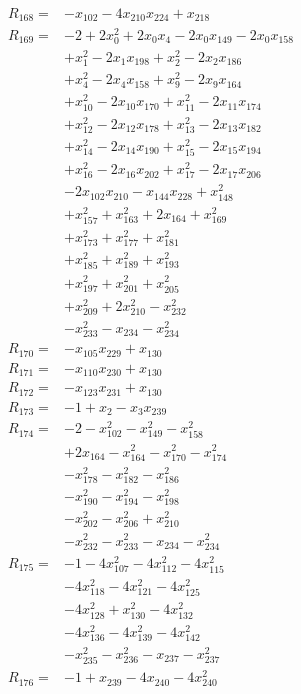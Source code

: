 \begin{align*}
R_{168}={}&-x_{102} -4x_{210}x_{224} +x_{218}\\[3pt]
R_{169}={}&-2 +2x_{0}^{2} +2x_{0}x_{4} -2x_{0}x_{149} -2x_{0}x_{158}\\
&+x_{1}^{2} -2x_{1}x_{198} +x_{2}^{2} -2x_{2}x_{186}\\
&+x_{4}^{2} -2x_{4}x_{158} +x_{9}^{2} -2x_{9}x_{164}\\
&+x_{10}^{2} -2x_{10}x_{170} +x_{11}^{2} -2x_{11}x_{174}\\
&+x_{12}^{2} -2x_{12}x_{178} +x_{13}^{2} -2x_{13}x_{182}\\
&+x_{14}^{2} -2x_{14}x_{190} +x_{15}^{2} -2x_{15}x_{194}\\
&+x_{16}^{2} -2x_{16}x_{202} +x_{17}^{2} -2x_{17}x_{206}\\
&-2x_{102}x_{210} -x_{144}x_{228} +x_{148}^{2}\\
&+x_{157}^{2} +x_{163}^{2} +2x_{164} +x_{169}^{2}\\
&+x_{173}^{2} +x_{177}^{2} +x_{181}^{2}\\
&+x_{185}^{2} +x_{189}^{2} +x_{193}^{2}\\
&+x_{197}^{2} +x_{201}^{2} +x_{205}^{2}\\
&+x_{209}^{2} +2x_{210}^{2} -x_{232}^{2}\\
&-x_{233}^{2} -x_{234} -x_{234}^{2}\\[3pt]
R_{170}={}&-x_{105}x_{229} +x_{130}\\[3pt]
R_{171}={}&-x_{110}x_{230} +x_{130}\\[3pt]
R_{172}={}&-x_{123}x_{231} +x_{130}\\[3pt]
R_{173}={}&-1 +x_{2} -x_{3}x_{239}\\[3pt]
R_{174}={}&-2 -x_{102}^{2} -x_{149}^{2} -x_{158}^{2}\\
&+2x_{164} -x_{164}^{2} -x_{170}^{2} -x_{174}^{2}\\
&-x_{178}^{2} -x_{182}^{2} -x_{186}^{2}\\
&-x_{190}^{2} -x_{194}^{2} -x_{198}^{2}\\
&-x_{202}^{2} -x_{206}^{2} +x_{210}^{2}\\
&-x_{232}^{2} -x_{233}^{2} -x_{234} -x_{234}^{2}\\[3pt]
R_{175}={}&-1 -4x_{107}^{2} -4x_{112}^{2} -4x_{115}^{2}\\
&-4x_{118}^{2} -4x_{121}^{2} -4x_{125}^{2}\\
&-4x_{128}^{2} +x_{130}^{2} -4x_{132}^{2}\\
&-4x_{136}^{2} -4x_{139}^{2} -4x_{142}^{2}\\
&-x_{235}^{2} -x_{236}^{2} -x_{237} -x_{237}^{2}\\[3pt]
R_{176}={}&-1 +x_{239} -4x_{240} -4x_{240}^{2}\\[3pt]
\end{align*}
